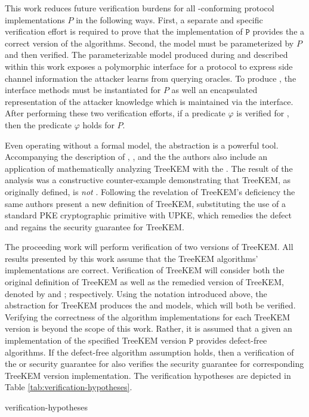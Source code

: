 This work reduces future verification burdens for all -conforming protocol implementations \(P\) in the following ways.
First, a separate and specific verification effort is required to prove that the implementation of \(\mathtt{P}\) provides the a correct version of the  algorithms.
Second, the model \CGKAmod{}{}{} must be parameterized by \(P\) and then verified.
The parameterizable model \CGKAmod{}{}{} produced during and described within this work exposes a polymorphic interface for a protocol to express side channel information the attacker learns from querying oracles.
To produce , the interface methods must be instantiated for \(P\) as well an encapsulated representation of the attacker knowledge which is maintained via the interface.
After performing these two verification efforts, if a predicate \(\varphi\) is verified for , then the predicate \(\varphi\) holds for \(P\).

Even operating without a formal model, the  abstraction is a powerful tool.
Accompanying the description of , \CGKAdef, and the \CGKAsec the authors also include an application of mathematically analyzing TreeKEM with the \CGKAsec.
The result of the analysis was a constructive counter-example demonstrating that TreeKEM, as originally defined, is \emph{not} .
Following the revelation of TreeKEM's deficiency the same authors present a new definition of TreeKEM, substituting the use of a standard PKE cryptographic primitive with UPKE, which remedies the defect and regains the  security guarantee for TreeKEM.

The proceeding work will perform verification of two versions of TreeKEM.
All results presented by this work assume that the TreeKEM algorithms' implementations are correct.
Verification of TreeKEM will consider both the original definition of TreeKEM as well as the remedied version of TreeKEM, denoted by \VersionOne and \VersionTwo; respectively.
Using the notation introduced above, the  abstraction for TreeKEM produces the \CGKAmod{\VersionOne}{}{} and \CGKAmod{\VersionTwo}{}{} models, which will both be verified.
Verifying the correctness of the  algorithm implementations for each TreeKEM version is beyond the scope of this work.
Rather, it is assumed that a given an implementation of the specified TreeKEM version \(\mathtt{P}\) provides defect-free algorithms.
If the defect-free algorithm assumption holds, then a verification of the  or  security guarantee for  also verifies the security guarantee for corresponding TreeKEM version implementation.
The verification hypotheses are depicted in Table \ref{tab:verification-hypotheses}.

\begin{table}[h!]                                                                                                                      
\caption{%
\label{tab:verification-hypotheses}%
Verification Hypotheses of .
}%
{verification-hypotheses}
\end{table}
